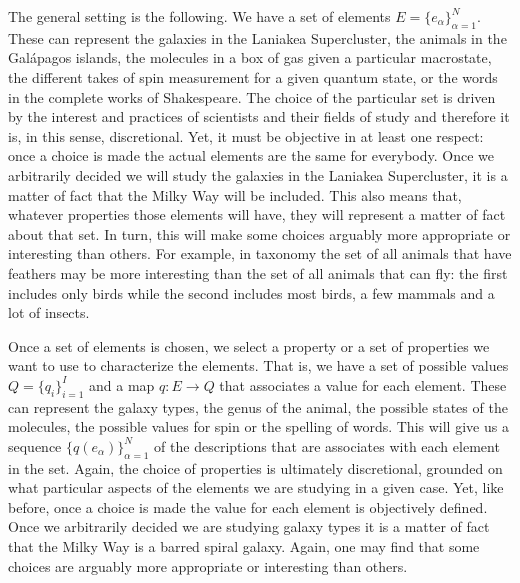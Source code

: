 \documentclass{article}
\begin{document}
The general setting is the following. We have a set of elements $E = \{e_\alpha\}_{\alpha=1}^N$. These can represent the galaxies in the Laniakea Supercluster, the animals in the Gal\'{a}pagos islands, the molecules in a box of gas given a particular macrostate, the different takes of spin measurement for a given quantum state, or the words in the complete works of Shakespeare. The choice of the particular set is driven by the interest and practices of scientists and their fields of study and therefore it is, in this sense, discretional. Yet, it must be objective in at least one respect: once a choice is made the actual elements are the same for everybody. Once we arbitrarily decided we will study the galaxies in the Laniakea Supercluster, it is a matter of fact that the Milky Way will be included. This also means that, whatever properties those elements will have, they will represent a matter of fact about that set. In turn, this will make some choices arguably more appropriate or interesting than others. For example, in taxonomy the set of all animals that have feathers may be more interesting than the set of all animals that can fly: the first includes only birds while the second includes most birds, a few mammals and a lot of insects.

Once a set of elements is chosen, we select a property or a set of properties we want to use to characterize the elements. That is, we have a set of possible values $Q=\{q_i\}_{i=1}^I$ and a map $q : E \to Q$ that associates a value for each element. These can represent the galaxy types, the genus of the animal, the possible states of the molecules, the possible values for spin or the spelling of words. This will give us a sequence $\{q(e_\alpha)\}_{\alpha=1}^N$ of the descriptions that are associates with each element in the set. Again, the choice of properties is ultimately discretional, grounded on what particular aspects of the elements we are studying in a given case. Yet, like before, once a choice is made the value for each element is objectively defined. Once we arbitrarily decided we are studying galaxy types it is a matter of fact that the Milky Way is a barred spiral galaxy. Again, one may find that some choices are arguably more appropriate or interesting than others.
\end{document}
